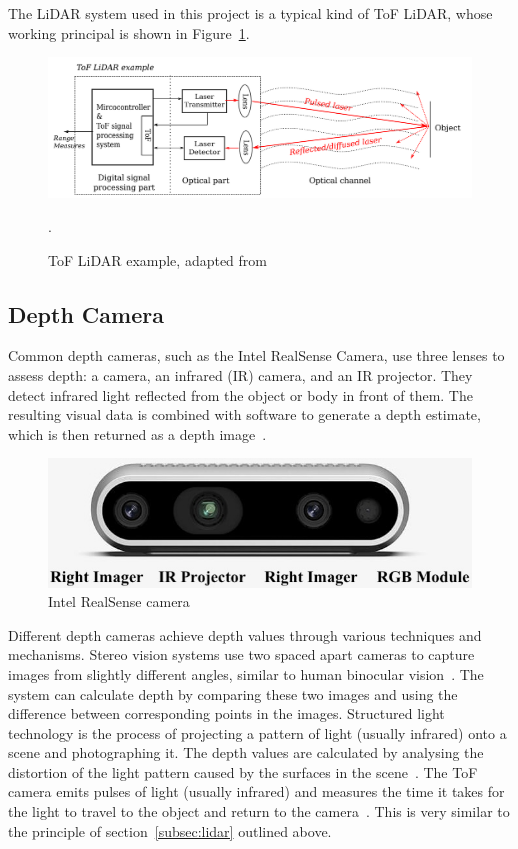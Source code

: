 The LiDAR system used in this project is a typical kind of ToF LiDAR, whose working principal is shown in Figure~\ref{fig:lidar_example}.

\begin{figure}[H]
    \centering
    \includegraphics[width=1\linewidth]{figs/lidar_example.png}
    \caption{ToF LiDAR example, adapted from~\cite{lidarexample}}.
    \label{fig:lidar_example}
\end{figure}

\subsection{Depth Camera}
Common depth cameras, such as the Intel RealSense Camera, use three lenses to assess depth: 
a camera, an infrared (IR) camera, and an IR projector. 
They detect infrared light reflected from the object or body in front of them. 
The resulting visual data is combined with software to generate a depth estimate, 
which is then returned as a depth image~\cite{depthcam}.

\begin{figure}[H]
    \centering
    \includegraphics[width=1.0\linewidth]{figs/realsense.jpg}
    \caption{Intel RealSense camera}
\end{figure}

Different depth cameras achieve depth values through various techniques and mechanisms. 
Stereo vision systems use two spaced apart cameras to capture images from slightly different angles, 
similar to human binocular vision~\cite{kinect}. 
The system can calculate depth by comparing these two images and using the difference between corresponding points in the images. 
Structured light technology is the process of projecting a pattern of light (usually infrared) onto a scene and photographing it. 
The depth values are calculated by analysing the distortion of the light pattern caused by the surfaces in the scene~\cite{rgbdmapping}.
The ToF camera emits pulses of light (usually infrared) and measures the time it takes for the light to travel to the object and return to the camera~\cite{tof}. 
This is very similar to the principle of section~\ref{subsec:lidar} outlined above.

